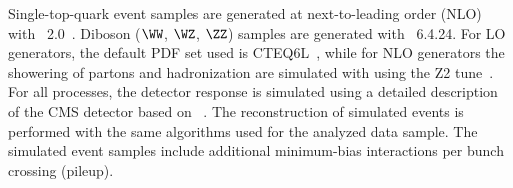 Single-top-quark event samples are generated at next-to-leading order (NLO) with
\POWHEG~2.0~\cite{Alioli:2008gx,Nason:2004rx,Frixione:2007vw}.
Diboson ($\WW$, $\WZ$, $\ZZ$) samples are
generated with
\PYTHIA~6.4.24.
For LO generators, the default PDF set used is CTEQ6L~\cite{CTEQ66}, while for NLO generators the
showering of partons and hadronization are simulated with \PYTHIA using the Z2
tune~\cite{Field:2010bc}.
For all processes, the detector response is simulated using a detailed
description of the CMS detector based on  \GEANTfour~\cite{GEANT}.
The reconstruction of simulated events is performed with
the same algorithms used for the analyzed data sample.
The simulated event samples include additional minimum-bias interactions per bunch crossing
(pileup).
